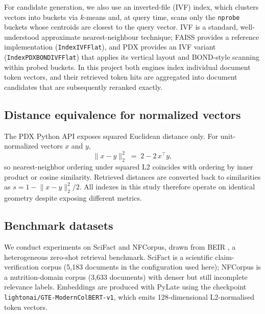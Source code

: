 For candidate generation, we also use an inverted-file (IVF) index, which clusters 
vectors into buckets via $k$-means and, at query time, scans only the \texttt{nprobe} 
buckets whose centroids are closest to the query vector. IVF is a standard, 
well-understood approximate nearest-neighbour technique; FAISS provides a reference 
implementation (\texttt{IndexIVFFlat}), and PDX provides an IVF variant 
(\texttt{IndexPDXBONDIVFFlat}) that applies its vertical layout and BOND-style 
scanning within probed buckets. In this project both engines index individual 
document token vectors, and their retrieved token hits are aggregated into document 
candidates that are subsequently reranked exactly.

\subsection{Distance equivalence for normalized vectors}

The PDX Python API exposes squared Euclidean distance only. For
unit-normalized vectors $x$ and $y$,
\begin{equation}
  \lVert x - y \rVert_2^2 \;=\; 2 - 2\, x^{\top} y ,
  \label{eq:l2-ip}
\end{equation}
so nearest-neighbor ordering under squared L2 coincides with ordering by
inner product or cosine similarity. Retrieved distances are converted back to
similarities as $s = 1 - \lVert x - y \rVert_2^2 / 2$. All indexes in this
study therefore operate on identical geometry despite exposing different
metrics.

\subsection{Benchmark datasets}

We conduct experiments on SciFact and NFCorpus, drawn from BEIR \citep{thakur2021beir}, 
a heterogeneous zero-shot retrieval benchmark. SciFact is a scientific claim-verification 
corpus (5,183 documents in the configuration used here); NFCorpus is a nutrition-domain 
corpus (3,633 documents) with denser but still incomplete relevance labels. Embeddings 
are produced with PyLate \citep{pylate} using the checkpoint \texttt{lightonai/GTE-ModernColBERT-v1}, 
which emits 128-dimensional L2-normalised token vectors.
